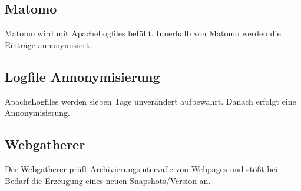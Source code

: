 \documentclass[letterpaper,10pt,english]{sphinxmanual}
\begin{document}
\begin{sphinxVerbatim}[commandchars=\\\{\}]
       
\end{sphinxVerbatim}


\subsection{Matomo}
\label{\detokenize{toscience:matomo-2}}\label{\detokenize{toscience:id79}}
\sphinxAtStartPar
Matomo wird mit Apache\sphinxhyphen{}Logfiles befüllt. Innerhalb von Matomo werden die
Einträge annonymisiert.

\begin{sphinxVerbatim}[commandchars=\\\{\}]
      
\end{sphinxVerbatim}


\subsection{Logfile Annonymisierung}
\label{\detokenize{toscience:logfile-annonymisierung}}\label{\detokenize{toscience:id80}}
\sphinxAtStartPar
Apache\sphinxhyphen{}Logfiles werden sieben Tage unverändert aufbewahrt. Danach
erfolgt eine Annonymisierung.

\begin{sphinxVerbatim}[commandchars=\\\{\}]
     
\end{sphinxVerbatim}


\subsection{Webgatherer}
\label{\detokenize{toscience:webgatherer}}\label{\detokenize{toscience:id81}}
\sphinxAtStartPar
Der Webgatherer prüft Archivierungsintervalle von Webpages und stößt bei
Bedarf die Erzeugung eines neuen Snapshots/Version an.
\end{document}
